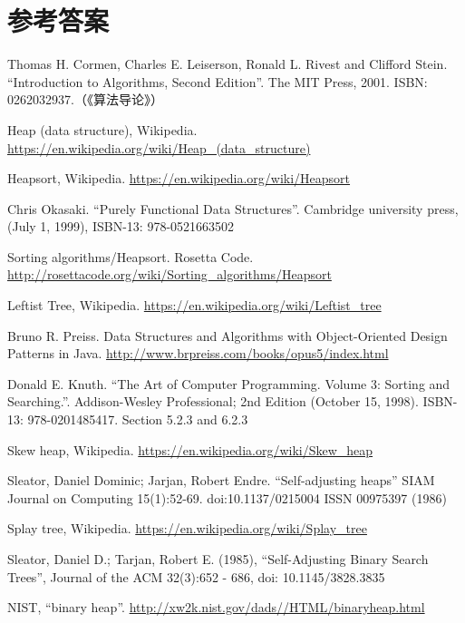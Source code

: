 \documentclass[b5paper]{ctexart}
\begin{document}
\ifx\wholebook\relax \else
\section{参考答案}
\shipoutAnswer

\begin{thebibliography}{99}

Thomas H. Cormen, Charles E. Leiserson, Ronald L. Rivest and Clifford Stein. ``Introduction to Algorithms, Second Edition''. The MIT Press, 2001. ISBN: 0262032937.（《算法导论》）

Heap (data structure), Wikipedia. \url{https://en.wikipedia.org/wiki/Heap_(data_structure)}

Heapsort, Wikipedia. \url{https://en.wikipedia.org/wiki/Heapsort}

Chris Okasaki. ``Purely Functional Data Structures''. Cambridge university press, (July 1, 1999), ISBN-13: 978-0521663502

Sorting algorithms/Heapsort. Rosetta Code. \url{http://rosettacode.org/wiki/Sorting_algorithms/Heapsort}

Leftist Tree, Wikipedia. \url{https://en.wikipedia.org/wiki/Leftist_tree}

Bruno R. Preiss. Data Structures and Algorithms with Object-Oriented Design Patterns in Java. \url{http://www.brpreiss.com/books/opus5/index.html}

Donald E. Knuth. ``The Art of Computer Programming. Volume 3: Sorting and Searching.''. Addison-Wesley Professional;
2nd Edition (October 15, 1998). ISBN-13: 978-0201485417. Section 5.2.3 and 6.2.3

Skew heap, Wikipedia. \url{https://en.wikipedia.org/wiki/Skew_heap}

Sleator, Daniel Dominic; Jarjan, Robert Endre. ``Self-adjusting heaps'' SIAM Journal on Computing 15(1):52-69. doi:10.1137/0215004 ISSN 00975397 (1986)

Splay tree, Wikipedia. \url{https://en.wikipedia.org/wiki/Splay_tree}

Sleator, Daniel D.; Tarjan, Robert E. (1985), ``Self-Adjusting Binary Search Trees'', Journal of the ACM 32(3):652 - 686, doi: 10.1145/3828.3835

NIST, ``binary heap''. \url{http://xw2k.nist.gov/dads//HTML/binaryheap.html}

\end{thebibliography}
\end{document}
